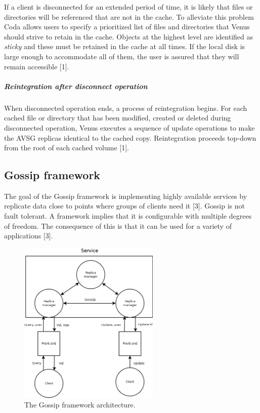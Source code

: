 If a client is disconnected for an extended period of time, it is likely that files or directories will be referenced that are not in the cache. To alleviate this problem Coda allows users to specify a prioritized list of files and directories that Venus should strive to retain in the cache. Objects at the highest level are identified as \emph{sticky} and these must be retained in the cache at all times. If the local disk is large enough to accommodate all of them, the user is assured that they will remain accessible [1].

\subparagraph{Reintegration after disconnect operation}

When disconnected operation ends, a process of reintegration begins. For each cached file or directory that has been modified, created or deleted during disconnected operation, Venus executes a sequence of update operations to make the AVSG replicas identical to the cached copy. Reintegration proceeds top-down from the root of each cached volume [1].




\subsection{Gossip framework}

The goal of the Gossip framework is implementing highly available services by replicate data close to points where groups of clients need it [3]. Gossip is not fault tolerant. A framework implies that it is configurable with multiple degrees of freedom. The consequence of this is that it can be used for a variety of applications [3].

\begin{figure}
	\begin{center}
		\includegraphics[width=0.6\textwidth]{img/gossiparchitecture}
	\end{center}
	\caption{The Gossip framework architecture.}
	\label{fig:gossiparchitecture}
\end{figure}


